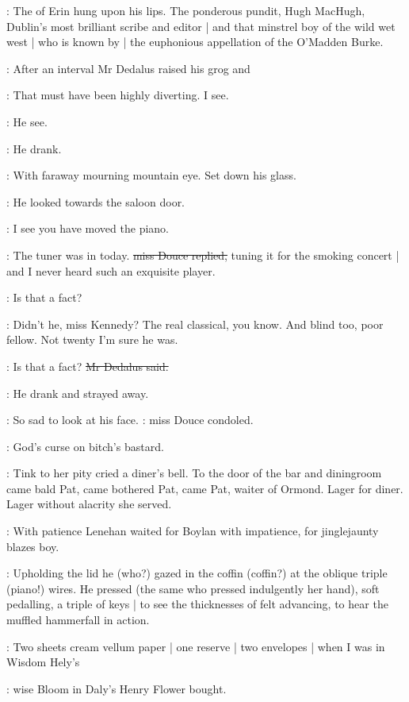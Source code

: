 \lenehan:
The  of Erin hung upon his lips.
The ponderous pundit,
Hugh MacHugh,
Dublin's most brilliant scribe and editor |
and that minstrel boy of the wild wet west |
who is known by |
the euphonious appellation of the O'Madden
Burke.

:
After an interval
Mr Dedalus raised his grog and

\simon:
That must have been highly diverting.
I see.

:
He see.

:
He drank.

:
With faraway mourning mountain eye.
Set down his glass.

:
He looked towards the saloon door.

\simon:
I see you have moved the piano.

\MissD:
The tuner was in today.
\sout{miss Douce replied,}
tuning it for the smoking concert |
and I never heard such an exquisite player.

\simon:
Is that a fact?

\MissD:
Didn't he,
miss Kennedy?
The real classical,
you know.
And blind too,
poor fellow.
Not twenty I'm sure he was.

\simon:
Is that a fact?
\sout{Mr Dedalus said.}

:
He drank and strayed away.

\MissD:
So sad to look at his face.
:
miss Douce condoled.

\stripling:
God's curse on bitch's bastard.

:
Tink to her pity cried a diner's bell.
To the door of the bar and diningroom came bald Pat,
came bothered Pat,
came Pat,
waiter of Ormond.
Lager for diner.
Lager without alacrity she served.


:
With patience 
Lenehan waited for Boylan with impatience,
for jinglejaunty
blazes boy.

:
Upholding the lid he (who?)
gazed in the coffin (coffin?)
at the oblique triple (piano!) wires.
He pressed
(the same who pressed indulgently her hand),
soft pedalling,
a triple of keys |
to see the thicknesses of felt advancing,
to hear the muffled hammerfall in action.

\BloomInt:
Two sheets cream vellum paper |
one reserve |
two envelopes |
when I was
in Wisdom Hely's

:
wise Bloom in Daly's Henry Flower bought.


